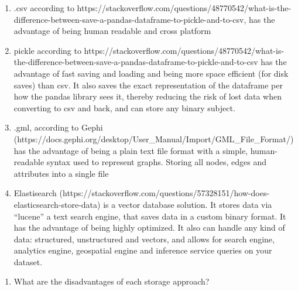 \documentclass[11pt]{article}
\providecommand{\tightlist}{%
      \setlength{\itemsep}{0pt}\setlength{\parskip}{0pt}}
\begin{document}
    \begin{enumerate}
\def\labelenumi{\arabic{enumi}.}
\tightlist
\item
  .csv according to
  https://stackoverflow.com/questions/48770542/what-is-the-difference-between-save-a-pandas-dataframe-to-pickle-and-to-csv,
  has the advantage of being human readable and cross platform
\item
  pickle according to
  https://stackoverflow.com/questions/48770542/what-is-the-difference-between-save-a-pandas-dataframe-to-pickle-and-to-csv
  has the advantage of fast saving and loading and being more space
  efficient (for disk saves) than csv. It also saves the exact
  representation of the dataframe per how the pandas library sees it,
  thereby reducing the risk of lost data when converting to csv and
  back, and can store any binary subject.
\item
  .gml, according to Gephi
  (https://docs.gephi.org/desktop/User\_Manual/Import/GML\_File\_Format/)
  has the advantage of being a plain text file format with a simple,
  human-readable syntax used to represent graphs. Storing all nodes,
  edges and attributes into a single file
\item
  Elastisearch
  (https://stackoverflow.com/questions/57328151/how-does-elasticsearch-store-data)
  is a vector database solution. It stores data via ``lucene'' a text
  search engine, that saves data in a custom binary format. It has the
  advantage of being highly optimized. It also can handle any kind of
  data: structured, unstructured and vectors, and allows for search
  engine, analytics engine, geospatial engine and inference service
  queries on your dataset.
\end{enumerate}

    \begin{enumerate}
\def\labelenumi{(\alph{enumi})}
\setcounter{enumi}{1}
\tightlist
\item
  What are the disadvantages of each storage approach?
\end{enumerate}
\end{document}
